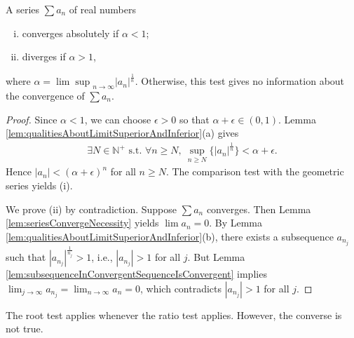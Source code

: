 \begin{thm}
  \label{thm:rootTest}
  A series $\sum a_n$ of real numbers
  \begin{enumerate}[(i)]\itemsep0em
  \item converges absolutely if $\alpha<1$;
  \item diverges if $\alpha>1$,
  \end{enumerate}
  where $\alpha={\lim\sup}_{n\rightarrow\infty}|a_n|^{\frac{1}{n}}$.
  Otherwise, this test gives no information
  about the convergence of $\sum a_n$.
\end{thm}
\begin{proof}
  Since $\alpha<1$, we can choose $\epsilon>0$ so that $\alpha+\epsilon\in (0,1)$.
  Lemma \ref{lem:qualitiesAboutLimitSuperiorAndInferior}(a) gives
  \begin{displaymath}
    \begin{array}{l}
    \exists N\in \mathbb{N}^+ \text{ s.t. }
    \forall n\ge N,
    \ \sup_{n\ge N}\{ |a_n|^{\frac{1}{n}}\} < \alpha+\epsilon.
    \end{array}
  \end{displaymath}
  Hence $|a_n|<(\alpha+\epsilon)^n$ for all $n\ge N$.
  The comparison test with the geometric series yields (i).

  We prove (ii) by contradiction.
  Suppose $\sum a_{n}$ converges.
  Then Lemma \ref{lem:seriesConvergeNecessity}
  yields $\lim a_{n}=0$.
  By Lemma \ref{lem:qualitiesAboutLimitSuperiorAndInferior}(b),
  there exists a subsequence $a_{n_{j}}$ such that
  $|a_{n_{j}}|^{\frac{1}{n_{j}}}>1$, i.e., $|a_{n_{j}}|>1$ for all $j$.
  But Lemma \ref{lem:subsequenceInConvergentSequenceIsConvergent} implies
  $\lim_{j\rightarrow\infty} a_{n_{j}}=\lim_{n\rightarrow\infty}a_{n}=0$,
  which contradicts $|a_{n_{j}}|>1$ for all $j$.
\end{proof}

\begin{rem}
  The root test applies whenever the ratio test applies.
  However, the converse is not true.
\end{rem}

